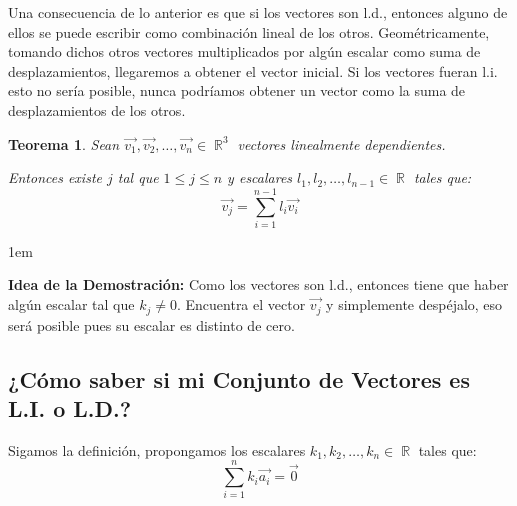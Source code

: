 \documentclass[12pt, fleqn]{report}                             %
\newenvironment{SmallIndentation}[1][0.75em]                    %
        {\begin{adjustwidth}{#1}{}\begin{footnotesize}}             %
        {\end{footnotesize}\end{adjustwidth}}                       %
\newtheorem{Theorem}        {Teorema}[section]                  %
\theoremstyle{break}                                            %
\DeclareMathOperator \Reals        {\mathbb{R}}                 %
\begin{document}
                Una consecuencia de lo anterior es que si los vectores son l.d., entonces alguno de ellos se puede
                escribir como combinación lineal de los otros. Geométricamente, tomando dichos otros vectores
                multiplicados por algún escalar como suma de desplazamientos, llegaremos a obtener el vector inicial.
                Si los vectores fueran l.i. esto no sería posible, nunca podríamos obtener un vector como la suma de
                desplazamientos de los otros.
            
                \begin{Theorem}
                    Sean $\vec{v_1}, \vec{v_2}, \ldots, \vec{v_n} \in \Reals^3$ vectores linealmente dependientes.

                    Entonces existe $j$ tal que $1 \leq j \leq n$ y escalares $l_1, l_2, \ldots, l_{n-1} \in \Reals$
                    tales que:
                    \begin{equation*}
                        \vec{v_j} = \sum_{i=1}^{n-1} l_i \vec{v_i}   
                    \end{equation*}
                \end{Theorem}
        
                \begin{SmallIndentation}[1em]
                    \textbf{Idea de la Demostración:} 
                        Como los vectores son l.d., entonces tiene que haber algún escalar
                        tal que $k_j \neq 0$. Encuentra el vector $\vec{v_j}$ y simplemente
                        despéjalo, eso será posible pues su escalar es distinto de cero.
                \end{SmallIndentation}
            

            \subsection{¿Cómo saber si mi Conjunto de Vectores es L.I. o L.D.?}
            
                Sigamos la definición, propongamos los escalares $k_1, k_2, \ldots, k_n \in \Reals$ tales que:
                \begin{equation*}
                    \sum_{i = 1}^{n} k_i \vec{a_i} = \vec{0}   
                \end{equation*}
\end{document}
